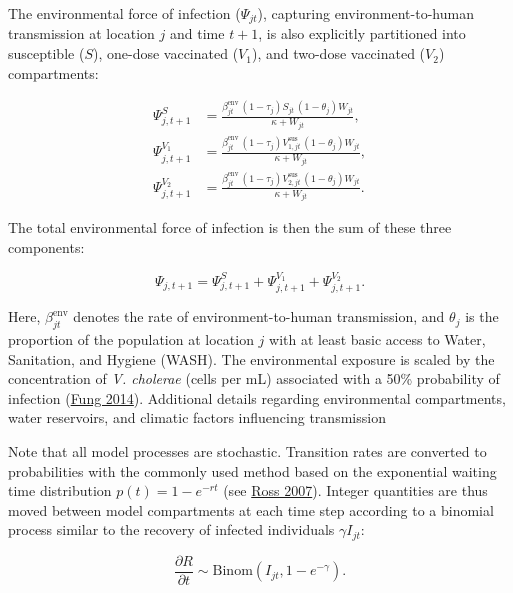 \documentclass[
]{book}
\begin{document}
The environmental force of infection (\(\Psi_{jt}\)), capturing environment-to-human transmission at location \(j\) and time \(t+1\), is also explicitly partitioned into susceptible (\(S\)), one-dose vaccinated (\(V_1\)), and two-dose vaccinated (\(V_2\)) compartments:

\begin{equation}
\begin{aligned}
\Psi^S_{j,t+1} &= \frac{\beta_{jt}^{\text{env}}\, (1-\tau_{j})S_{jt}\,(1-\theta_j)W_{jt}}{\kappa + W_{jt}},\\[4mm]
\Psi^{V_1}_{j,t+1} &= \frac{\beta_{jt}^{\text{env}}\, (1-\tau_{j})V^{\text{sus}}_{1,jt}\,(1-\theta_j)W_{jt}}{\kappa + W_{jt}},\\[4mm]
\Psi^{V_2}_{j,t+1} &= \frac{\beta_{jt}^{\text{env}}\, (1-\tau_{j})V^{\text{sus}}_{2,jt}\,(1-\theta_j)W_{jt}}{\kappa + W_{jt}}.
\end{aligned}
\label{eq:foi-environment}
\end{equation}

The total environmental force of infection is then the sum of these three components:

\begin{equation}
\Psi_{j,t+1} = \Psi^S_{j,t+1} + \Psi^{V_1}_{j,t+1} + \Psi^{V_2}_{j,t+1}.
\label{eq:foi-environment-total}
\end{equation}

Here, \(\beta_{jt}^{\text{env}}\) denotes the rate of environment-to-human transmission, and \(\theta_j\) is the proportion of the population at location \(j\) with at least basic access to Water, Sanitation, and Hygiene (WASH). The environmental exposure is scaled by the concentration of \emph{V. cholerae} (cells per mL) associated with a 50\% probability of infection (\href{https://www.ncbi.nlm.nih.gov/pmc/articles/PMC3926264/}{Fung 2014}). Additional details regarding environmental compartments, water reservoirs, and climatic factors influencing transmission

Note that all model processes are stochastic. Transition rates are converted to probabilities with the commonly used method based on the exponential waiting time distribution \(p(t) = 1-e^{-rt}\) (see \href{https://www.google.com/books/edition/Introduction_to_Probability_Models/1uxBwhAb_zYC?hl=en}{Ross 2007}). Integer quantities are thus moved between model compartments at each time step according to a binomial process similar to the recovery of infected individuals \(\gamma I_{jt}\):

\begin{equation}
\frac{\partial R}{\partial t} \sim \text{Binom}(I_{jt}, 1-e^{-\gamma}).
\end{equation}
\end{document}
